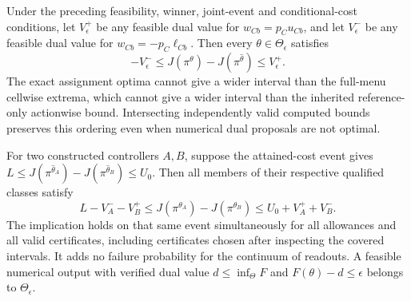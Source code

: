 \begin{theorem}\label{thm:compatible84}
Under the preceding feasibility, winner, joint-event and conditional-cost conditions, let $V_\epsilon^+$ be any feasible dual value for $w_{Cb}=p_Cu_{Cb}$, and let $V_\epsilon^-$ be any feasible dual value for $w_{Cb}=-p_C\ell_{Cb}$. Then every $\theta\in\Theta_\epsilon$ satisfies
\begin{equation}\label{eq:compatible-cost84}
 -V_\epsilon^-\le J(\pi^\theta)-J(\pi^{\widehat\theta})
                    \le V_\epsilon^+.
\end{equation}
The exact assignment optima cannot give a wider interval than the full-menu cellwise extrema, which cannot give a wider interval than the inherited reference-only actionwise bound. Intersecting independently valid computed bounds preserves this ordering even when numerical dual proposals are not optimal.

For two constructed controllers $A,B$, suppose the attained-cost event gives
$L\le J(\pi^{\widehat\theta_A})-J(\pi^{\widehat\theta_B})\le U_0$.
Then all members of their respective qualified classes satisfy
\begin{equation}\label{eq:compatible-comparison84}
 L-V_A^- -V_B^+\le J(\pi^{\theta_A})-J(\pi^{\theta_B})
                       \le U_0+V_A^+ +V_B^-.
\end{equation}
The implication holds on that same event simultaneously for all allowances and all valid certificates, including certificates chosen after inspecting the covered intervals. It adds no failure probability for the continuum of readouts. A feasible numerical output with verified dual value $d\le\inf_\Theta F$ and $F(\theta)-d\le\epsilon$ belongs to $\Theta_\epsilon$.
\end{theorem}

